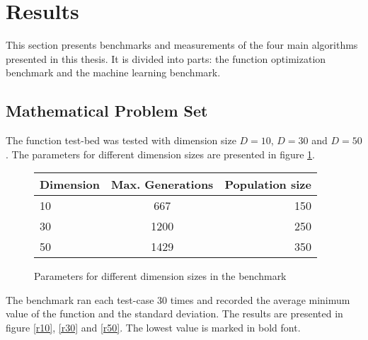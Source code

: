 \section{Results}

This section presents benchmarks and measurements of the four main algorithms presented in this thesis. It is divided into parts: the function optimization benchmark and the machine learning benchmark.

\subsection{Mathematical Problem Set}

The function test-bed was tested with dimension size $D=10$, $D=30$ and $D=50$. The parameters for different dimension sizes are presented in figure \ref{t1}.

\begin{figure}[H]
  \centering
  \begin{center}
    \begin{tabular}{ | l | c | r | }
      \hline
      Dimension & Max. Generations & Population size \\ \hline
      10 & 667 & 150 \\ \hline
      30 & 1200 & 250 \\ \hline
      50 & 1429 & 350 \\
      \hline
    \end{tabular}
  \end{center}
  \caption{Parameters for different dimension sizes in the benchmark}
  \label{t1}
\end{figure}

The benchmark ran each test-case 30 times and recorded the average minimum value of the function and the standard deviation. The results are presented in figure \ref{r10}, \ref{r30} and \ref{r50}. The lowest value is marked in bold font.




